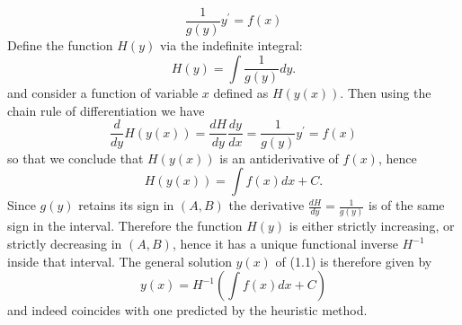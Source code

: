 \documentclass[11pt,a4paper,twoside]{article}
\begin{document}
\begin{enumerate}[(a)]
			\begin{equation}
					\frac{1}{g(y)}y^\prime = f(x)
			\end{equation}
			Define the function $H(y)$ via the indefinite integral:
			$$
			H(y) = \int \frac{1}{g(y)}dy.
			$$
			and consider a function of variable $x$ defined as $H(y(x))$. Then using the chain rule of differentiation we have
			\begin{equation}
					\frac{d}{dy}H(y(x))
					= \frac{dH}{dy}\frac{dy}{dx}
					= \frac{1}{g(y)}y^\prime = f(x)
			\end{equation}
			so that we conclude that $H(y(x))$ is an antiderivative of $f(x)$, hence
			$$
			H(y(x)) = \int f(x)dx + C.
			$$
			Since $g(y)$ retains its sign in $(A, B)$ the derivative $\frac{dH}{dy} = \frac{1}{g(y)}$ is of the same sign in the interval. Therefore the function $H(y)$ is either strictly increasing, or strictly decreasing in $(A, B)$, hence it has a unique functional inverse $H^{−1}$ inside that interval. The general solution $y(x)$ of (1.1) is therefore given by
			\begin{equation}
					y(x) = H^{-1}\left(\int f(x)dx + C\right)
			\end{equation}
			and indeed coincides with one predicted by the heuristic method.
	\end{enumerate}
\end{document}
